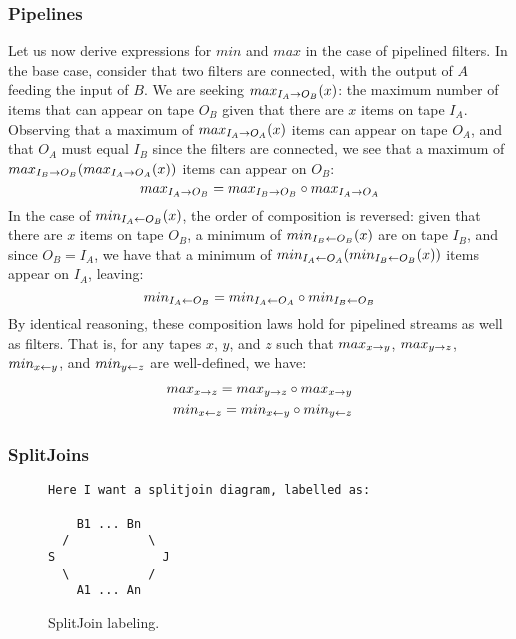 \subsubsection{Pipelines}

Let us now derive expressions for $min$ and $max$ in the case of
pipelined filters.  In the base case, consider that two filters are
connected, with the output of $A$ feeding the input of $B$.  We are
seeking $max_{I_A \rightarrow O_B}(x)$: the maximum number of items that can
appear on tape $O_B$ given that there are $x$ items on tape $I_A$.
Observing that a maximum of $max_{I_A \rightarrow O_A}(x)$ items can appear on
tape $O_A$, and that $O_A$ must equal $I_B$ since the filters are
connected, we see that a maximum of
$max_{I_B \rightarrow O_B}(max_{I_A \rightarrow O_A}(x))$ items can appear on $O_B$:
\begin{equation*}
max_{I_A \rightarrow O_B} = max_{I_B \rightarrow O_B} \circ max_{I_A \rightarrow O_A}
\end{equation*}
In the case of $min_{I_A \leftarrow O_B}(x)$, the order of composition is
reversed: given that there are $x$ items on tape $O_B$, a minimum of
$min_{I_B \leftarrow O_B}(x)$ are on tape $I_B$, and since $O_B = I_A$, we have
that a minimum of $min_{I_A \leftarrow O_A}(min_{I_B \leftarrow O_B}(x))$ items appear on
$I_A$, leaving:
\begin{equation*}
min_{I_A \leftarrow O_B} = min_{I_A \leftarrow O_A} \circ min_{I_B \leftarrow O_B}
\end{equation*}
By identical reasoning, these composition laws hold for pipelined
streams as well as filters.  That is, for any tapes $x$, $y$, and $z$
such that $max_{x \rightarrow y}$, $max_{y \rightarrow z}$, $min_{x \leftarrow y}$, and $min_{y \leftarrow z}$ are
well-defined, we have:
\begin{eqnarray*}
max_{x \rightarrow z} = max_{y \rightarrow z} \circ max_{x \rightarrow y} \\
min_{x \leftarrow z} = min_{x \leftarrow y} \circ min_{y \leftarrow z}
\end{eqnarray*}

\subsubsection{SplitJoins}
\begin{figure}[t]
\scriptsize
\begin{verbatim}
Here I want a splitjoin diagram, labelled as:

    B1 ... Bn 
  /           \
S               J
  \           /
    A1 ... An

\end{verbatim}
\vspace{-12pt}
\caption{\protect\small SplitJoin labeling.
\protect\label{splitjoin}}
\vspace{-12pt}
\end{figure}

